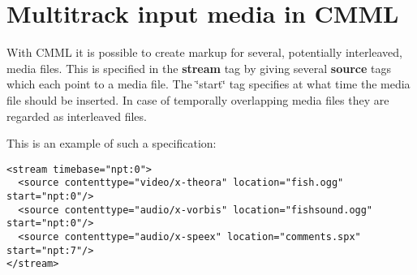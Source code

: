 \section{Multitrack input media in CMML}
\label{group__multitracks}
With CMML it is possible to create markup for several, potentially interleaved, media files. This is specified in the {\bf stream} tag by giving several {\bf source} tags which each point to a media file. The \char`\"{}start\char`\"{} tag specifies at what time the media file should be inserted. In case of temporally overlapping media files they are regarded as interleaved files.

This is an example of such a specification: 

\footnotesize\begin{verbatim}
<stream timebase="npt:0">
  <source contenttype="video/x-theora" location="fish.ogg" start="npt:0"/>
  <source contenttype="audio/x-vorbis" location="fishsound.ogg" start="npt:0"/>
  <source contenttype="audio/x-speex" location="comments.spx" start="npt:7"/>
</stream>
\end{verbatim}
\normalsize
